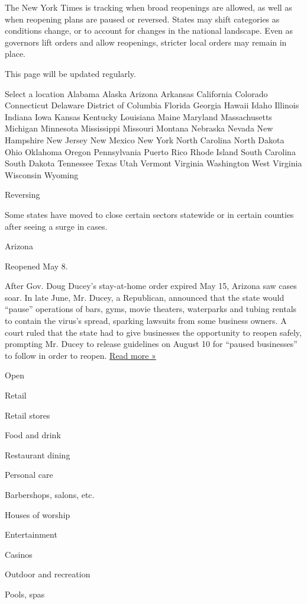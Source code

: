 The New York Times is tracking when broad reopenings are allowed, as
well as when reopening plans are paused or reversed. States may shift
categories as conditions change, or to account for changes in the
national landscape. Even as governors lift orders and allow reopenings,
stricter local orders may remain in place.

This page will be updated regularly.

Select a location Alabama Alaska Arizona Arkansas California Colorado
Connecticut Delaware District of Columbia Florida Georgia Hawaii Idaho
Illinois Indiana Iowa Kansas Kentucky Louisiana Maine Maryland
Massachusetts Michigan Minnesota Mississippi Missouri Montana Nebraska
Nevada New Hampshire New Jersey New Mexico New York North Carolina North
Dakota Ohio Oklahoma Oregon Pennsylvania Puerto Rico Rhode Island South
Carolina South Dakota Tennessee Texas Utah Vermont Virginia Washington
West Virginia Wisconsin Wyoming

Reversing

Some states have moved to close certain sectors statewide or in certain
counties after seeing a surge in cases.

Arizona

Reopened May 8.

After Gov. Doug Ducey's stay-at-home order expired May 15, Arizona saw
cases soar. In late June, Mr. Ducey, a Republican, announced that the
state would ``pause'' operations of bars, gyms, movie theaters,
waterparks and tubing rentals to contain the virus's spread, sparking
lawsuits from some business owners. A court ruled that the state had to
give businesses the opportunity to reopen safely, prompting Mr. Ducey to
release guidelines on August 10 for ``paused businesses'' to follow in
order to reopen.
\href{https://www.fox10phoenix.com/news/arizona-gov-ducey-releases-guidelines-for-paused-businesses-to-reopen}{Read
more »}

Open

Retail

Retail stores

Food and drink

Restaurant dining

Personal care

Barbershops, salons, etc.

Houses of worship

Entertainment

Casinos

Outdoor and recreation

Pools, spas

